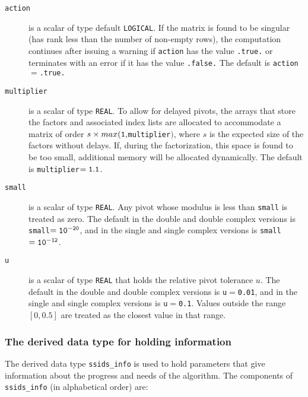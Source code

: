 \documentclass{spral}
\begin{document}
\begin{description}
\item[\texttt{action}] is a scalar of type default {\tt LOGICAL}.
If the matrix is found to be singular (has rank less than the number of
non-empty rows), the computation continues after issuing a warning if
{\tt action} has the value {\tt .true.} or
terminates with an error if it has the value {\tt .false.}
The default is {\tt action}$=${\tt .true.}

\item[\texttt{multiplier}] is a scalar of type {\tt REAL}.
To allow for delayed pivots, the arrays that store the factors and associated
index lists are allocated to accommodate a matrix of order
$s \times max({\tt 1},${\tt multiplier}$)$, where $s$ is the expected size of
the factors without delays.
If, during the factorization, this space is found to be too small, additional
memory will be allocated dynamically.
The default is {\tt multiplier}$ = {\tt 1.1}$.

\item[\texttt{small}] is a scalar of type {\tt REAL}.
Any pivot whose modulus is less than {\tt small} is treated as zero.
The default in the double and double complex versions is
{\tt small}$ = {\tt 10^{-20}}$, and in the single and single complex versions
is {\tt small}$ = {\tt 10^{-12}}$.

\item[\texttt{u}] is a scalar of type {\tt REAL} that holds the relative pivot
tolerance $u$.
The default in the double and double complex versions is {\tt u}$=${\tt 0.01},
and in the single and single complex versions is {\tt u}$=${\tt 0.1}.
Values outside the range $[0,0.5]$ are treated as the closest value in that range.
\end{description}


\subsubsection{The derived data type for holding information}
\label{typeinform}
The derived data type {\tt ssids\_info}
is used to hold parameters that give information about the progress and needs
of the algorithm. The components of {\tt ssids\_info}
(in alphabetical order) are:
\end{document}
